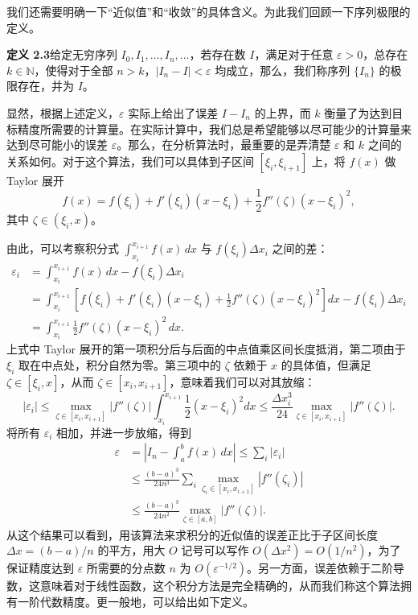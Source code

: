 我们还需要明确一下“近似值”和“收敛”的具体含义。为此我们回顾一下序列极限的定义。

\textbf{定义 2.3}\quad 给定无穷序列 $I_0,I_1,\ldots,I_n,\ldots$，若存在数 $I$，满足对于任意 $\varepsilon>0$，总存在 $k\in\mathbb{N}$，使得对于全部 $n>k$，$|I_n-I|<\varepsilon$ 均成立，那么，我们称序列 $\{I_n\}$ 的极限存在，并为 $I$。

显然，根据上述定义，$\varepsilon$ 实际上给出了误差 $I-I_n$ 的上界，而 $k$ 衡量了为达到目标精度所需要的计算量。在实际计算中，我们总是希望能够以尽可能少的计算量来达到尽可能小的误差 $\varepsilon$。那么，在分析算法时，最重要的是弄清楚 $\varepsilon$ 和 $k$ 之间的关系如何。对于这个算法，我们可以具体到子区间 $[\xi_i,\xi_{i+1}]$ 上，将 $f(x)$ 做 Taylor 展开
\begin{equation}
f(x)=f(\xi_i)+f'(\xi_i)(x-\xi_i)+\frac12f''(\zeta)(x-\xi_i)^2,
\tag{2.2.2}
\end{equation}
其中 $\zeta\in(\xi_i,x)$。

由此，可以考察积分式 $\int_{x_i}^{x_{i+1}}f(x)\,dx$ 与 $f(\xi_i)\Delta x_i$ 之间的差：
\[
\begin{aligned}
\varepsilon_i&=\int_{x_i}^{x_{i+1}}f(x)\,dx-f(\xi_i)\Delta x_i\\
&=\int_{x_i}^{x_{i+1}}\left[f(\xi_i)+f'(\xi_i)(x-\xi_i)+\frac12f''(\zeta)(x-\xi_i)^2\right]dx-f(\xi_i)\Delta x_i\\
&=\int_{x_i}^{x_{i+1}}\frac12f''(\zeta)(x-\xi_i)^2\,dx.
\end{aligned}
\]
上式中 Taylor 展开的第一项积分后与后面的中点值乘区间长度抵消，第二项由于 $\xi_i$ 取在中点处，积分自然为零。第三项中的 $\zeta$ 依赖于 $x$ 的具体值，但满足 $\zeta\in[\xi_i,x]$，从而 $\zeta\in[x_i,x_{i+1}]$，意味着我们可以对其放缩：
\[
|\varepsilon_i|\le \max_{\zeta\in[x_i,x_{i+1}]}|f''(\zeta)|\int_{x_i}^{x_{i+1}}\frac12(x-\xi_i)^2dx
\le\frac{\Delta x_i^3}{24}\max_{\zeta\in[x_i,x_{i+1}]}|f''(\zeta)|.
\]
将所有 $\varepsilon_i$ 相加，并进一步放缩，得到
\begin{equation}
\begin{aligned}
\varepsilon&=\left|I_n-\int_a^b f(x)\,dx\right|\le\sum_i|\varepsilon_i|\\
&\le\frac{(b-a)^3}{24n^3}\sum_i\max_{\zeta_i\in[x_i,x_{i+1}]}|f''(\zeta_i)|\\
&\le\frac{(b-a)^3}{24n^2}\max_{\zeta\in[a,b]}|f''(\zeta)|.
\end{aligned}
\tag{2.2.3}
\end{equation}
从这个结果可以看到，用该算法来求积分的近似值的误差正比于子区间长度 $\Delta x=(b-a)/n$ 的平方，用大 $O$ 记号可以写作 $O(\Delta x^2)=O(1/n^2)$，为了保证精度达到 $\varepsilon$ 所需要的分点数 $n$ 为 $O(\varepsilon^{-1/2})$。另一方面，误差依赖于二阶导数，这意味着对于线性函数，这个积分方法是完全精确的，从而我们称这个算法拥有一阶代数精度。更一般地，可以给出如下定义。

